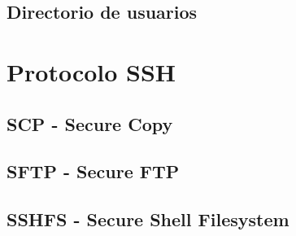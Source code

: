   \subsection {Directorio de usuarios}
\section {Protocolo SSH}
  \subsection {SCP - Secure Copy}
  \subsection {SFTP - Secure FTP}
  \subsection {SSHFS - Secure Shell Filesystem}

